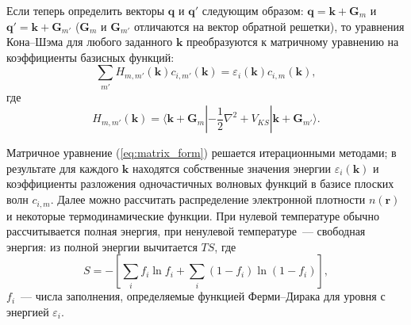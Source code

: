 Если теперь определить векторы $\mathbf{q}$ и $\mathbf{q}'$ следующим образом: $\mathbf{q} = \mathbf{k} + \mathbf{G}_m$ и $\mathbf{q}' = \mathbf{k} + \mathbf{G}_{m'}$ ($\mathbf{G}_m$ и $\mathbf{G}_{m'}$ отличаются на вектор обратной решетки), то уравнения Кона--Шэма для любого заданного $\mathbf{k}$ преобразуются к матричному уравнению на коэффициенты базисных функций:
\begin{equation}
    \sum_{m'} H_{m,m'}(\mathbf{k}) c_{i,m'}(\mathbf{k}) = \varepsilon_i(\mathbf{k})c_{i,m}(\mathbf{k}),
    \label{eq:matrix_form}
\end{equation}
%
где
%
\begin{equation}
    H_{m,m'}(\mathbf{k}) = \langle\mathbf{k} + \mathbf{G}_m|-\frac{1}{2}\nabla^2 + V_{KS}|
        \mathbf{k} + \mathbf{G}_{m'}\rangle.
\end{equation}
%

Матричное уравнение (\ref{eq:matrix_form}) решается итерационными методами; в результате для каждого $\mathbf{k}$ находятся собственные значения энергии $\varepsilon_i(\mathbf{k})$ и коэффициенты разложения одночастичных волновых функций в базисе плоских волн $c_{i,m}$. Далее можно рассчитать распределение электронной плотности $n(\mathbf{r})$ и некоторые термодинамические функции. При нулевой температуре обычно рассчитывается полная энергия, при ненулевой температуре~--- свободная энергия: из полной энергии вычитается $TS$, где 
%
\begin{equation}
    S = -\left[
        \sum_{i} f_i \ln f_i + \sum_{i}(1 - f_i)\ln(1 - f_i)
    \right],
\end{equation}
%
$f_i$~--- числа заполнения, определяемые функцией Ферми--Дирака для уровня с энергией $\varepsilon_i$.

%


